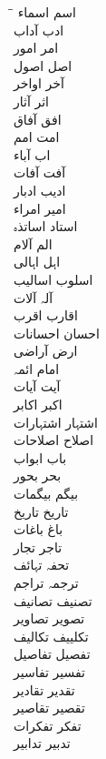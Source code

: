 \documentclass[a4paper]{article}
\begin{document}
\RTL
\notourdu
\begin{multicols}{3}
\begin{tabbing}
\hspace*{2cm}\=\hspace*{2cm}\= \kill
اسم \> اسماء\\
ادب \> آداب\\
امر \> امور\\
اصل \> اصول\\
آخر \> اواخر\\
اثر \> آثار\\
افق \> آفاق\\
امت \> امم\\
اب \> آباء\\
آفت \> آفات\\
ادیب \> ادبار\\
امیر \> امراء\\
استاد \> اساتذہ\\
الم \> آلام\\
اہل \> اہالی\\
اسلوب \> اسالیب\\
آلہ \> آلات\\
اقارب \> اقرب\\
احسان \> احسانات\\
ارض \> آراضی\\
امام \> ائمہ\\
آیت \> آیات\\
اکبر \> اکابر\\
اشتہار \> اشتہارات\\
اصلاح \> اصلاحات\\
باب \> ابواب\\
بحر \> بحور\\
بیگم \> بیگمات\\
تاریخ \> تاریخ\\
باغ \> باغات\\
تاجر \> تجار\\
تحفہ \> تہائف\\
ترجمہ \> تراجم\\
تصنیف \> تصانیف\\
تصویر \> تصاویر\\
تکلییف \> تکالیف\\
تفصیل \> تفاصیل\\
تفسیر \> تفاسیر\\
تقدیر \> تقادیر\\
تقصیر \> تقاصیر\\
تفکر \> تفکرات\\
تدبیر \> تدابیر\\

\end{tabbing}
\end{multicols}
\end{document}
